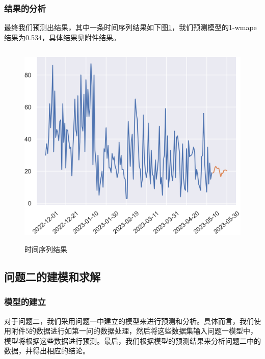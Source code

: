 \documentclass[withoutpreface,bwprint]{cumcmthesis}
\begin{document}
\subsubsection{结果的分析}
 最终我们预测出结果，其中一条时间序列结果如下图\ref{时间序列结果}，我们预测模型的1-wmape结果为0.534，具体结果见附件结果。
  \begin{figure}[htbp]
     \centering
     \includegraphics[width=15cm,height=10cm]{figure/第一条时间序列结果.png}%
     \caption{时间序列结果}
     \label{时间序列结果}
    \end{figure}
\subsection{问题二的建模和求解}
\subsubsection{模型的建立}
对于问题二，我们采用问题一中建立的模型来进行预测和分析。具体而言，我们使用附件5的数据进行如第一问的数据处理，然后将这些数据集输入问题一模型中，模型将根据这些数据进行预测。最后，我们根据模型的预测结果来分析问题二中的数据，并得出相应的结论。
\end{document}
